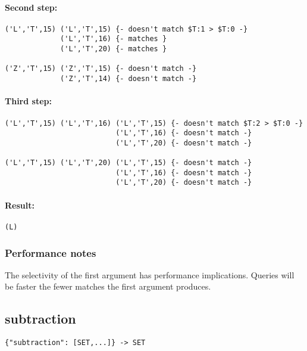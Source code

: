 \documentclass[a4paper]{article}
\begin{document}
\paragraph*{Second step:}

\begin{verbatim}
('L','T',15) ('L','T',15) {- doesn't match $T:1 > $T:0 -}
             ('L','T',16) {- matches }
             ('L','T',20) {- matches }

('Z','T',15) ('Z','T',15) {- doesn't match -}
             ('Z','T',14) {- doesn't match -}
\end{verbatim}

\paragraph*{Third step:}

\begin{verbatim}
('L','T',15) ('L','T',16) ('L','T',15) {- doesn't match $T:2 > $T:0 -}
                          ('L','T',16) {- doesn't match -}
                          ('L','T',20) {- doesn't match -}

('L','T',15) ('L','T',20) ('L','T',15) {- doesn't match -}
                          ('L','T',16) {- doesn't match -}
                          ('L','T',20) {- doesn't match -}                      
\end{verbatim}


\paragraph*{Result: }

\begin{verbatim}
(L)
\end{verbatim}

\subsubsection{Performance notes}

The selectivity of the first argument has performance
implications. Queries will be faster the fewer matches the first
argument produces.

\subsection{subtraction}

\begin{verbatim}
{"subtraction": [SET,...]} -> SET
\end{verbatim}
\end{document}
